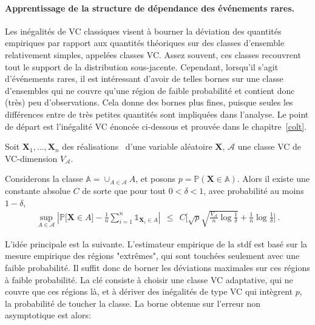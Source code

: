 \paragraph{Apprentissage de la structure de dépendance des événements rares.}
Les inégalités de VC classiques visent à bourner la déviation des quantités empiriques par rapport aux quantités théoriques sur des classes d'ensemble relativement simples, appelées classes VC. Assez souvent, ces classes recouvrent tout le support de la distribution sous-jacente. Cependant, lorsqu'il s'agit d'événements rares, il est intéressant d'avoir de telles bornes sur une classe d'ensembles qui ne couvre qu'une région de faible probabilité et contient donc (très) peu d'observations. Cela donne des bornes plus fines, puisque seules les différences entre de très petites quantités sont impliquées dans l'analyse. Le point de départ est l'inégalité VC énoncée ci-dessous et prouvée dans le chapitre~\ref {colt}.

\begin{theorem}
\label{resume_fr:thm-princ} 
Soit $\mathbf{X}_1,\ldots,\mathbf{X}_n$ des réalisations \iid~d'une variable aléatoire $\mathbf{X}$, $\mathcal{A}$  une classe VC de VC-dimension $V_{\mathcal{A}}$. 

Considerons la classe $\mathbb{A} = \cup_{A \in \mathcal{A}} A$, et posons $p = \mathbb{P}(\mathbf{X} \in \mathbb{A})$. 
Alors il existe une constante absolue $ C $ de sorte que pour tout $ 0 <\delta <1 $, avec probabilité au moins $ 1- \delta $,
\begin{align*}
\sup_{A \in \mathcal{A}} \left| \mathbb{P} \big[\mathbf{X} \in A\big] - \frac{1}{n} \sum_{i=1}^n \mathds{1}_{\mathbf{X}_i \in A}  \right| ~~\le~~ C \bigg[ \sqrt{p}\sqrt{\frac{V_{\mathcal{A}}}{n} \log{\frac{1}{\delta}}} + \frac{1}{n} \log{\frac{1}{\delta}} \bigg]~.
\end{align*}
\end{theorem}

L'idée principale est la suivante. L'estimateur empirique de la {\sc stdf} est basé sur la mesure empirique des régions "extrêmes", qui sont touchées seulement avec une faible probabilité. Il suffit donc de borner les déviations maximales sur ces régions à faible probabilité.
La clé consiste à choisir une classe VC adaptative, qui ne couvre que ces régions là, et à dériver des inégalités de type VC qui intègrent $p$, la probabilité de toucher la classe. La borne obtenue sur l'erreur non asymptotique est alors:

